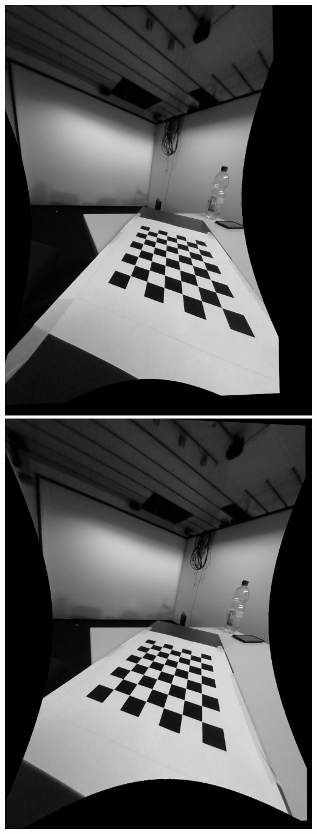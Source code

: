 \documentclass[]{article}
\begin{document}
\begin{enumerate}
  \includegraphics*{13.jpg}
	\includegraphics*{14.jpg}

\end{enumerate}
\end{document}
